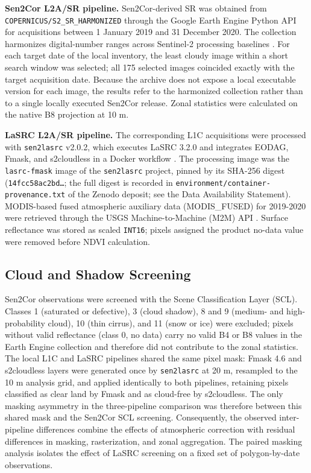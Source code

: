 \documentclass[
  authoryear,
  preprint]{elsarticle}
\begin{document}
\textbf{Sen2Cor L2A/SR pipeline.} Sen2Cor-derived SR was obtained from
\texttt{COPERNICUS/S2\_SR\_HARMONIZED} through the Google Earth Engine
Python API for acquisitions between 1 January 2019 and 31 December 2020.
The collection harmonizes digital-number ranges across Sentinel-2
processing baselines \citep{GEE2026S2SR}. For each target date of the
local inventory, the least cloudy image within a short search window was
selected; all 175 selected images coincided exactly with the target
acquisition date. Because the archive does not expose a local executable
version for each image, the results refer to the harmonized collection
rather than to a single locally executed Sen2Cor release. Zonal
statistics were calculated on the native B8 projection at 10 m.

\textbf{LaSRC L2A/SR pipeline.} The corresponding L1C acquisitions were
processed with \texttt{sen2lasrc} v2.0.2, which executes LaSRC 3.2.0 and
integrates EODAG, Fmask, and s2cloudless in a Docker workflow
\citep{deBoissieu2024, Qiu2019, SentinelHubS2Cloudless}. The processing
image was the \texttt{lasrc-fmask} image of the \texttt{sen2lasrc}
project, pinned by its SHA-256 digest (\texttt{14fcc58ac2bd…}; the full
digest is recorded in \texttt{environment/container-provenance.txt} of
the Zenodo deposit; see the Data Availability Statement). MODIS-based
fused atmospheric auxiliary data (MODIS\_FUSED) for 2019-2020 were
retrieved through the USGS Machine-to-Machine (M2M) API
\citep{USGS2026M2M}. Surface reflectance was stored as scaled
\texttt{INT16}; pixels assigned the product no-data value were removed
before NDVI calculation.

\subsection{Cloud and Shadow Screening}\label{sec-masks}

Sen2Cor observations were screened with the Scene Classification Layer
(SCL). Classes 1 (saturated or defective), 3 (cloud shadow), 8 and 9
(medium- and high-probability cloud), 10 (thin cirrus), and 11 (snow or
ice) were excluded; pixels without valid reflectance (class 0, no data)
carry no valid B4 or B8 values in the Earth Engine collection and
therefore did not contribute to the zonal statistics. The local L1C and
LaSRC pipelines shared the same pixel mask: Fmask 4.6 and s2cloudless
layers were generated once by \texttt{sen2lasrc} at 20 m, resampled to
the 10 m analysis grid, and applied identically to both pipelines,
retaining pixels classified as clear land by Fmask and as cloud-free by
s2cloudless. The only masking asymmetry in the three-pipeline comparison
was therefore between this shared mask and the Sen2Cor SCL screening.
Consequently, the observed inter-pipeline differences combine the
effects of atmospheric correction with residual differences in masking,
rasterization, and zonal aggregation. The paired masking analysis
isolates the effect of LaSRC screening on a fixed set of polygon-by-date
observations.
\end{document}
